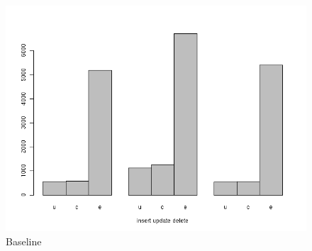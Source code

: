 	
\begin{figure}[h] \centering
\includegraphics[width=.8\textwidth]{./figure/result/Solution0-barplot.png}
		\caption{Baseline}\label{fr:Solution0-barplot}
	\end{figure}
	
